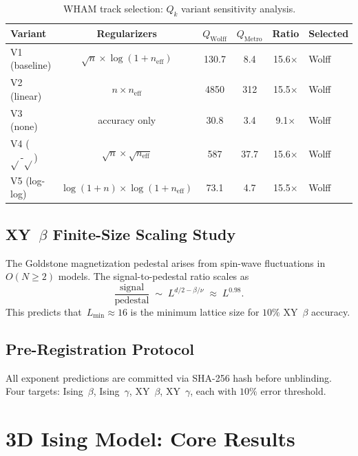 \documentclass[11pt,a4paper]{article}
\begin{document}
\begin{table}[ht]
\centering
\caption{WHAM track selection: $Q_k$ variant sensitivity analysis.}
\label{tab:Q_variants}
\begin{tabular}{@{}lccccl@{}}
\toprule
Variant & Regularizers & $Q_{\text{Wolff}}$ & $Q_{\text{Metro}}$ & Ratio & Selected \\
\midrule
V1 (baseline) & $\sqrt{n}\times\log(1{+}n_{\text{eff}})$ & 130.7 & 8.4 & 15.6$\times$ & Wolff \\
V2 (linear) & $n\times n_{\text{eff}}$ & 4850 & 312 & 15.5$\times$ & Wolff \\
V3 (none) & accuracy only & 30.8 & 3.4 & 9.1$\times$ & Wolff \\
V4 ($\sqrt{}\text{-}\sqrt{}$) & $\sqrt{n}\times\sqrt{n_{\text{eff}}}$ & 587 & 37.7 & 15.6$\times$ & Wolff \\
V5 (log-log) & $\log(1{+}n)\times\log(1{+}n_{\text{eff}})$ & 73.1 & 4.7 & 15.5$\times$ & Wolff \\
\bottomrule
\end{tabular}
\end{table}

\subsection{XY~\texorpdfstring{$\beta$}{beta} Finite-Size Scaling Study}\label{sec:xy_beta_fss}

The Goldstone magnetization pedestal arises from spin-wave fluctuations in $O(N \geq 2)$ models. The signal-to-pedestal ratio scales as
\begin{equation}\label{eq:pedestal}
  \frac{\text{signal}}{\text{pedestal}} \;\sim\; L^{d/2 - \beta/\nu} \;\approx\; L^{0.98}.
\end{equation}
This predicts that~$L_{\min} \approx 16$ is the minimum lattice size for $10\%$ XY~$\beta$ accuracy.

\subsection{Pre-Registration Protocol}\label{sec:prereg}

All exponent predictions are committed via SHA-256 hash before unblinding. Four targets: Ising~$\beta$, Ising~$\gamma$, XY~$\beta$, XY~$\gamma$, each with $10\%$ error threshold.

\section{3D Ising Model: Core Results}\label{sec:ising}
\end{document}
